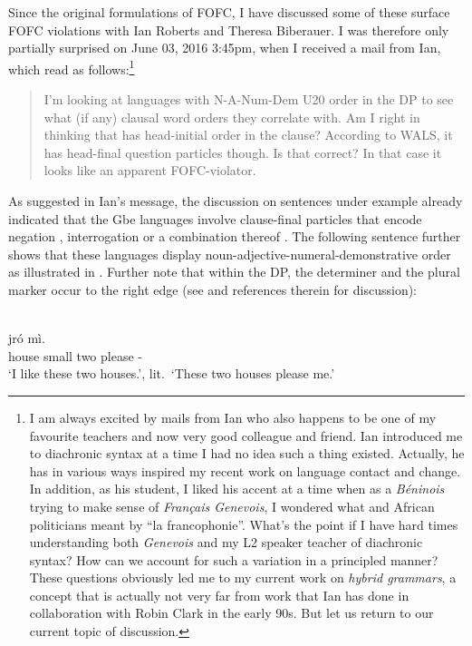 \documentclass[output=paper]{langsci/langscibook}
\begin{document}
Since the original formulations of FOFC, I have discussed some of these surface
FOFC violations with Ian Roberts and Theresa Biberauer. I was therefore only
partially surprised on June 03, 2016 3:45pm, when I received a mail from Ian,
which read as follows:\footnote{I am always excited by mails from Ian who also
    happens to be one of my favourite teachers and now very good colleague and
    friend. Ian introduced me to diachronic syntax at a time I had no idea such
    a thing existed. Actually, he has in various ways inspired my recent work
    on language contact and change. In addition, as his student, I liked his
     accent at a time when as a \emph{Béninois} trying to make sense of
    \emph{Français Genevois}, I wondered what  and African politicians
    meant by \enquote{la francophonie}. What’s the point if I have hard times
    understanding both \emph{Genevois} and my  L2 speaker teacher of
    diachronic syntax? How can we account for such a variation in a principled
    manner? These questions obviously led me to my current work on \emph{hybrid
    grammars}, a concept that is actually not very far from work that Ian has
    done in collaboration with Robin Clark in the early 90s. But let us return
to our current topic of discussion.}

\blockquote{I'm looking at languages with N-A-Num-Dem U20 order in the DP to
    see what (if any) clausal word orders they correlate with. Am I right in
    thinking that  has head-initial order in the clause? According to
    WALS, it has head-final question particles though. Is that correct? In that
    case it looks like an apparent FOFC-violator.}

As suggested in Ian’s message, the discussion on sentences under example
 already indicated that the Gbe languages involve clause-final
particles that encode negation , interrogation
 or a combination thereof . The following
sentence further shows that these languages display
noun-adjective-numeral-demonstrative order as illustrated in .
Further note that within the DP, the determiner and the plural marker occur to
the right edge (see \citealt{Aboh2004a,Aboh2004b} and references therein for
discussion):

\ea\label{ex:aboh:14.4} \\
     jró mì. \\
            {} house small two \Dem{} \Det{} \Pl{} {} please \Fsg-\Acc{} \\
    \glt    \enquote*{I like these two houses.}, lit.\ \enquote*{These
            two houses please me.}
\z
\end{document}
